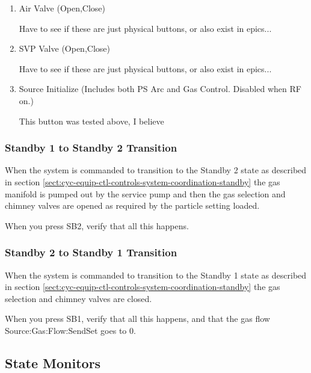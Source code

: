 \documentclass[11pt]{book}		%
\begin{document}
\begin{enumerate}
 \item Air Valve (Open,Close)

\color{red}
Have to see if these are just physical buttons, or also exist in epics...
\color{black}

 \item SVP Valve (Open,Close)

\color{red}
Have to see if these are just physical buttons, or also exist in epics...
\color{black}

 \item Source Initialize (Includes both PS Arc and Gas Control. Disabled when RF on.)

\color{red}
This button was tested above, I believe
\color{black}

\end{enumerate}

\subsubsection{Standby 1 to Standby 2 Transition}

When the system is commanded to transition to the Standby 2 state as described in section \ref{sect:cyc-equip-ctl-controls-system-coordination-standby} the gas manifold is pumped out by the service pump and then the gas selection and chimney valves are opened as required by the particle setting loaded.

\color{red}
When you press SB2, verify that all this happens.
\color{black}

\subsubsection{Standby 2 to Standby 1 Transition}

When the system is commanded to transition to the Standby 1 state as described in section \ref{sect:cyc-equip-ctl-controls-system-coordination-standby} the gas selection and chimney valves are closed.

\color{red}
When you press SB1, verify that all this happens, and that the gas flow Source:Gas:Flow:SendSet goes to 0.
\color{black}

\subsection{State Monitors}
\end{document}
